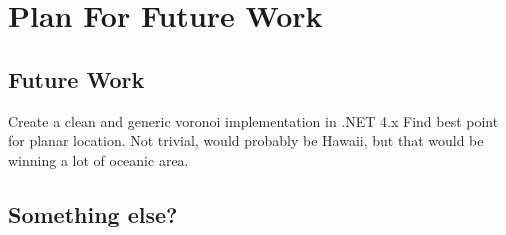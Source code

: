 \section{Plan For Future Work}
\subsection{Future Work}
\label{sec:future_work}
Create a clean and generic voronoi implementation in .NET 4.x
Find best point for planar location. Not trivial, would probably be Hawaii, but that would
be winning a lot of oceanic area.
\subsection{Something else?}

